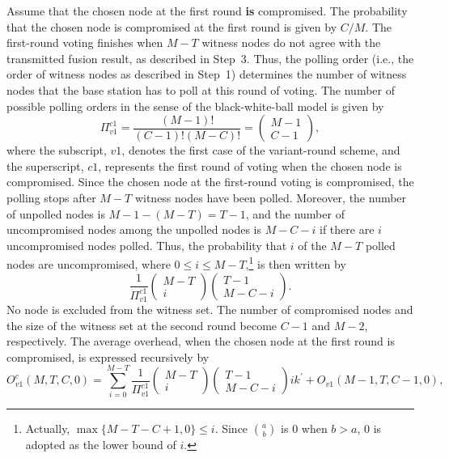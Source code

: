 \documentclass[12pt, onecolumn, draftcls]{IEEEtran}
\begin{document}
Assume that the chosen node at the first round {\bf is} compromised.
The probability that the chosen node is compromised at the first
round is given by $C/M$. The first-round voting finishes when $M-T$
witness nodes do not agree with the transmitted fusion result, as
described in Step~3. Thus, the polling order (i.e., the order of
witness nodes as described in Step~1) determines the number of
witness nodes that the base station has to poll at this round of
voting. The number of possible polling orders in the sense of the
black-white-ball model is given by
\[
\Pi_{v1}^{c1} = \frac{(M-1)!}{(C-1)!(M-C)!} = \left(\begin{array}{c} M-1 \\
C-1
\end{array}\right),
\]
where the subscript, $v1$, denotes the first case of the
variant-round scheme, and the superscript, $c1$, represents the
first round of voting when the chosen node is compromised. Since the
chosen node at the first-round voting is compromised, the polling
stops after $M-T$ witness nodes have been polled. Moreover, the
number of unpolled nodes is $M-1-(M-T)=T-1$, and the number of
uncompromised nodes among the unpolled nodes is $M-C-i$ if there are
$i$ uncompromised nodes polled. Thus, the probability that $i$ of
the $M-T$ polled nodes are uncompromised, where $0\le i \le
M-T$,\footnote{Actually, $\max \{M-T-C+1,0\}\le i$. Since ${a
\choose b}$ is $0$ when $b>a$, $0$ is adopted as the lower bound of
$i$.} is then written by
\[
\frac{1}{\Pi_{v1}^{c1}}{\left(\begin{array}{c} M-T \\ i
\end{array}\right) \left(\begin{array}{c} T-1 \\M-C-i
\end{array}\right)}.
\]
No node is excluded from the witness set. The number of compromised
nodes and the size of the witness set at the second round become
$C-1$ and $M-2$, respectively. The average overhead, when the chosen
node at the first round is compromised, is expressed recursively by
\begin{equation}
O_{v1}^{c}(M,T,C,0) = \sum_{i=0}^{M-T}\frac{1}{\Pi_{v1}^{c1}}
{\left(\begin{array}{c} M-T
\\ i \end{array}\right) \left(\begin{array}{c} T-1 \\M-C-i
\end{array}\right)} i
k^{\prime} + O_{v1}(M-1,T,C-1,0),
\label{eqn:polling_invalid_compromised_overhead0}
\end{equation}
\end{document}

